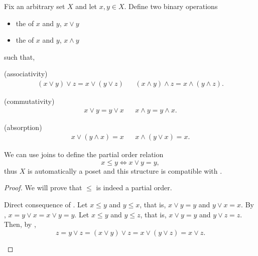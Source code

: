\begin{definition}\label{def:binary_join_meet}
  Fix an arbitrary set \( X \) and let \( x, y \in X \). Define two binary operations
  \begin{itemize}
    \item the  of \( x \) and \( y \), \( x \vee y \)
    \item the  of \( x \) and \( y \), \( x \wedge y \)
  \end{itemize}
  such that,
  \begin{defenum}
    (associativity)
    \begin{align*}
      (x \vee y) \vee z = x \vee (y \vee z)
      &&
      (x \wedge y) \wedge z = x \wedge (y \wedge z).
    \end{align*}

    (commutativity)
    \begin{align*}
      x \vee y = y \vee x
      &&
      x \wedge y = y \wedge x.
    \end{align*}

    (absorption)
    \begin{align*}
      x \vee (y \wedge x) = x
      &&
      x \wedge (y \vee x) = x.
    \end{align*}
  \end{defenum}

  We can use joins to define the partial order relation
  \begin{equation*}
    x \leq y \iff x \vee y = y,
  \end{equation*}
  thus \( X \) is automatically a poset and this structure is compatible with .
\end{definition}
\begin{proof}
  We will prove that \( \leq \) is indeed a partial order.
  \begin{description}
     Direct consequence of .
     Let \( x \leq y \) and \( y \leq x \), that is, \( x \vee y = y \) and \( y \vee x = x \). By , \( x = y \vee x = x \vee y = y \).
     Let \( x \leq y \) and \( y \leq z \), that is, \( x \vee y = y \) and \( y \vee z = z \). Then, by ,
    \begin{equation*}
      z = y \vee z = (x \vee y) \vee z = x \vee (y \vee z) = x \vee z.
    \end{equation*}
  \end{description}
\end{proof}

